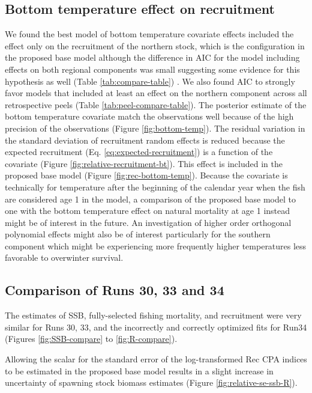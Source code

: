\documentclass[
]{article}
\begin{document}
\hypertarget{bottom-temperature-effect-on-recruitment}{%
\subsection{Bottom temperature effect on recruitment}\label{bottom-temperature-effect-on-recruitment}}

We found the best model of bottom temperature covariate effects included the effect only on the recruitment of the northern stock, which is the configuration in the proposed base model although the difference in AIC for the model including effects on both regional components was small suggesting some evidence for this hypothesis as well (Table \ref{tab:compare-table}) . We also found AIC to strongly favor models that included at least an effect on the northern component across all retrospective peels (Table \ref{tab:peel-compare-table}). The posterior estimate of the bottom temperature covariate match the observations well because of the high precision of the observations (Figure \ref{fig:bottom-temp}). The residual variation in the standard deviation of recruitment random effects is reduced because the expected recruitment (Eq. \ref{eq:expected-recruitment}) is a function of the covariate (Figure \ref{fig:relative-recruitment-bt}). This effect is included in the proposed base model (Figure \ref{fig:rec-bottom-temp}). Because the covariate is technically for temperature after the beginning of the calendar year when the fish are considered age 1 in the model, a comparison of the proposed base model to one with the bottom temperature effect on natural mortality at age 1 instead might be of interest in the future. An investigation of higher order orthogonal polynomial effects might also be of interest particularly for the southern component which might be experiencing more frequently higher temperatures less favorable to overwinter survival.

\hypertarget{comparison-of-runs-30-33-and-34}{%
\subsection{Comparison of Runs 30, 33 and 34}\label{comparison-of-runs-30-33-and-34}}

The estimates of SSB, fully-selected fishing mortality, and recruitment were very similar for Runs 30, 33, and the incorrectly and correctly optimized fits for Run34 (Figures \ref{fig:SSB-compare} to \ref{fig:R-compare}).

Allowing the scalar for the standard error of the log-transformed Rec CPA indices to be estimated in the proposed base model results in a slight increase in uncertainty of spawning stock biomass estimates (Figure \ref{fig:relative-se-ssb-R}).
\end{document}
